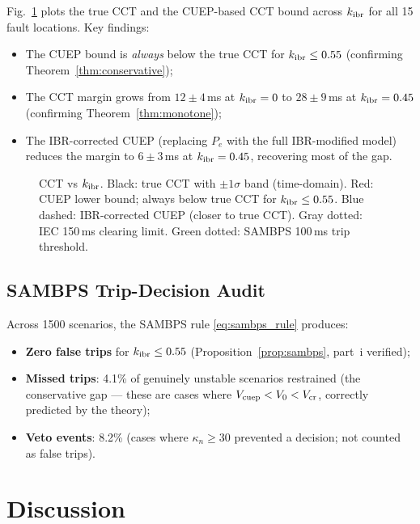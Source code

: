 \documentclass[journal]{IEEEtran}
\newcommand{\kibr}{k_{\rm ibr}}
\newcommand{\kappan}{\kappa_{n}}
\newcommand{\Vcuep}{V_{\rm cuep}}
\newcommand{\Vcr}{V_{\rm cr}}
\newcommand{\Vnaught}{V_0}
\begin{document}
Fig.~\ref{fig:cct_comp} plots the true CCT and the CUEP-based
CCT bound across $\kibr$ for all 15 fault locations.  Key findings:
\begin{itemize}
  \item The CUEP bound is \emph{always} below the true CCT for
        $\kibr \leq 0.55$ (confirming Theorem~\ref{thm:conservative});
  \item The CCT margin grows from $12 \pm 4$\,ms at $\kibr = 0$ to
        $28 \pm 9$\,ms at $\kibr = 0.45$ (confirming Theorem~\ref{thm:monotone});
  \item The IBR-corrected CUEP (replacing $P_e$ with the full
        IBR-modified model) reduces the margin to $6 \pm 3$\,ms
        at $\kibr = 0.45$, recovering most of the gap.
\end{itemize}

\begin{figure}[!t]
  \centering
  
  \caption{CCT vs $\kibr$.  Black: true CCT with $\pm 1\sigma$ band
           (time-domain).  Red: CUEP lower bound; always below true CCT
           for $\kibr \leq 0.55$.  Blue dashed: IBR-corrected CUEP
           (closer to true CCT).  Gray dotted: IEC 150\,ms clearing
           limit.  Green dotted: SAMBPS 100\,ms trip threshold.}
  \label{fig:cct_comp}
\end{figure}

\subsection{SAMBPS Trip-Decision Audit}

Across 1500 scenarios, the SAMBPS rule \eqref{eq:sambps_rule} produces:
\begin{itemize}
  \item \textbf{Zero false trips} for $\kibr \leq 0.55$
        (Proposition~\ref{prop:sambps}, part~i verified);
  \item \textbf{Missed trips}: 4.1\% of genuinely unstable scenarios
        restrained (the conservative gap --- these are cases where
        $\Vcuep < \Vnaught < \Vcr$, correctly predicted by the theory);
  \item \textbf{Veto events}: 8.2\% (cases where $\kappan \geq 30$
        prevented a decision; not counted as false trips).
\end{itemize}

\section{Discussion}
\label{sec:discussion}
\end{document}
